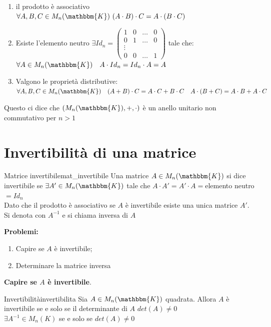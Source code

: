 \documentclass[12pt, letterpaper]{report}
\newcounter{theorem}
\newcounter{definition}
\newcommand{\nmu}{}
\begin{document}
  		\begin{enumerate}
  			\item il prodotto è associativo $\forall A,B, C \in M_n(\mathbbm{K})\ (A \cdot B) \cdot C = A \cdot (B \cdot C)$
  			\item Esiste l'elemento neutro $\exists Id_n = \begin{pmatrix}
  				1 & 0 & \dots & 0 \\
  				0 & 1 & \dots & 0 \\
  				\vdots \\
  				0 & 0 & \dots & 1
  			\end{pmatrix}$ tale che: \\
  			$\forall A \in M_n(\mathbbm{K}) \quad A \cdot Id_n = Id_n \cdot A = A$
  			\item Valgono le proprietà distributive: \\
  			$\forall A,B,C \in M_n(\mathbbm{K}) \quad (A + B) \cdot C = A\cdot C + B \cdot C \quad A \cdot (B + C) = A\cdot B + A \cdot C$
  		\end{enumerate}
  		Questo ci dice che $(M_n(\mathbbm{K}), +, \cdot)$ è un anello unitario non commutativo per $n > 1$
  		\section{Invertibilità di una matrice}
  		\begin{definition}{\nmu Matrice invertibile}{mat_invertibile}
  			Una matrice $A \in M_{n}(\mathbbm{K})$ si dice invertibile se $\exists A' \in M_n(\mathbbm{K})$ tale che $A \cdot A' = A' \cdot A = $elemento neutro$=Id_n$ \\
  			Dato che il prodotto è associativo se $A$ è invertibile esiste una unica matrice $A'$. Si denota con $A^{-1}$ e si chiama inversa di $A$
  		\end{definition}
  		\textbf{Problemi:}
  		\begin{enumerate}
  			\item Capire se $A$ è invertibile;
  			\item Determinare la matrice inversa
  		\end{enumerate}
  		\textbf{Capire se $A$ è invertibile}.
  		 \begin{theorem}{\nmu Invertibilità}{invertibilita}
  			Sia $A \in M_{n}(\mathbbm{K})$ quadrata. Allora $A$ è invertibile se e solo se il determinante di $A$ $det(A) \neq 0$ \\
  			$\exists A^{-1} \in M_n(K)$ se e solo se $det(A) \neq 0$
  		\end{theorem}
\end{document}
